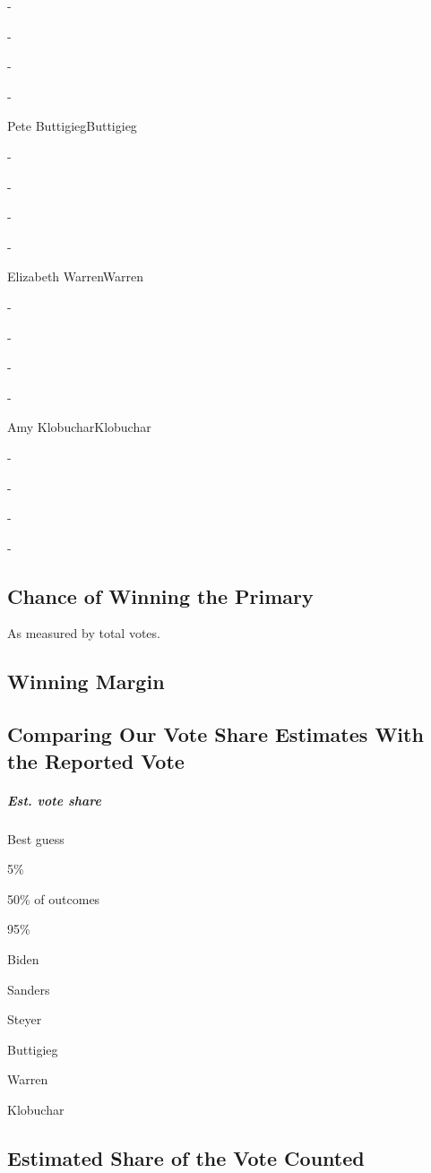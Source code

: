 -

-

-

-

Pete ButtigiegButtigieg

-

-

-

-

Elizabeth WarrenWarren

-

-

-

-

Amy KlobucharKlobuchar

-

-

-

-

\hypertarget{chance-of-winning-the-primary}{%
\subsection{Chance of Winning the
Primary}\label{chance-of-winning-the-primary}}

As measured by total votes.

\hypertarget{winning-margin}{%
\subsection{Winning Margin}\label{winning-margin}}

\hypertarget{comparing-our-vote-share-estimates-with-the-reported-vote}{%
\subsection{Comparing Our Vote Share Estimates With the Reported
Vote}\label{comparing-our-vote-share-estimates-with-the-reported-vote}}

\hypertarget{est-vote-share}{%
\subparagraph{Est. vote share}\label{est-vote-share}}

Best guess

5\%

50\% of outcomes

95\%

Biden

Sanders

Steyer

Buttigieg

Warren

Klobuchar

\hypertarget{estimated-share-of-the-vote-counted}{%
\subsection{Estimated Share of the Vote
Counted}\label{estimated-share-of-the-vote-counted}}

